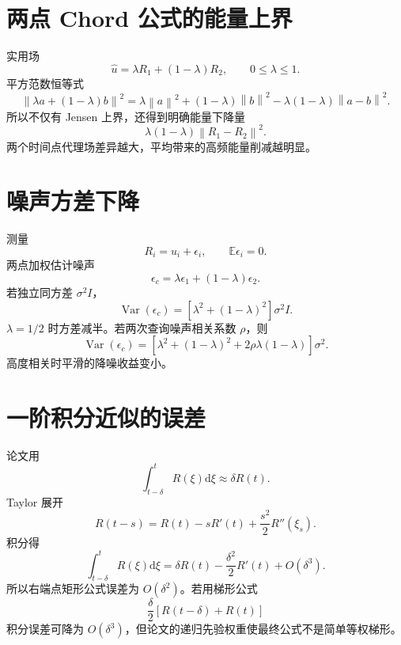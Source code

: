 \documentclass[UTF8,12pt,a4paper,fontset=none]{ctexart}
\numberwithin{equation}{section}
\newcommand{\E}{\mathbb{E}}
\newcommand{\norm}[1]{\left\lVert #1\right\rVert}
\newcommand{\dd}{\mathrm{d}}
\begin{document}
\section{两点 Chord 公式的能量上界}
实用场
\begin{equation}
 \widehat u=\lambda R_1+(1-\lambda)R_2,
 \qquad 0\le\lambda\le1.
\end{equation}
平方范数恒等式
\begin{equation}
 \norm{\lambda a+(1-\lambda)b}^2
 =\lambda\norm a^2+(1-\lambda)\norm b^2
 -\lambda(1-\lambda)\norm{a-b}^2.
\end{equation}
所以不仅有 Jensen 上界，还得到明确能量下降量
\begin{equation}
 \lambda(1-\lambda)\norm{R_1-R_2}^2.
\end{equation}
两个时间点代理场差异越大，平均带来的高频能量削减越明显。

\section{噪声方差下降}
测量
\begin{equation}
 R_i=u_i+\epsilon_i,
 \qquad \E\epsilon_i=0.
\end{equation}
两点加权估计噪声
\begin{equation}
 \epsilon_c=\lambda\epsilon_1+(1-\lambda)\epsilon_2.
\end{equation}
若独立同方差 $\sigma^2I$，
\begin{equation}
 \operatorname{Var}(\epsilon_c)
 =[\lambda^2+(1-\lambda)^2]\sigma^2I.
\end{equation}
$\lambda=1/2$ 时方差减半。若两次查询噪声相关系数 $\rho$，则
\begin{equation}
 \operatorname{Var}(\epsilon_c)
 =[\lambda^2+(1-\lambda)^2+2\rho\lambda(1-\lambda)]\sigma^2.
\end{equation}
高度相关时平滑的降噪收益变小。

\section{一阶积分近似的误差}
论文用
\begin{equation}
 \int_{t-\delta}^{t}R(\xi)\dd\xi
 \approx\delta R(t).
\end{equation}
Taylor 展开
\begin{equation}
 R(t-s)=R(t)-sR'(t)+\frac{s^2}{2}R''(\xi_s).
\end{equation}
积分得
\begin{equation}
 \int_{t-\delta}^{t}R(\xi)\dd\xi
 =\delta R(t)-\frac{\delta^2}{2}R'(t)+O(\delta^3).
\end{equation}
所以右端点矩形公式误差为 $O(\delta^2)$。若用梯形公式
\begin{equation}
 \frac\delta2[R(t-\delta)+R(t)]
\end{equation}
积分误差可降为 $O(\delta^3)$，但论文的递归先验权重使最终公式不是简单等权梯形。
\end{document}
